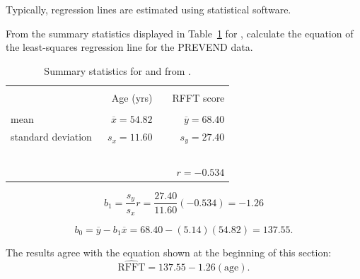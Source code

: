 Typically, regression lines are estimated using statistical software.

\begin{example}{From the summary statistics displayed in Table~\ref{summaryAgeRFFT} for , calculate the equation of the least-squares regression line for the PREVEND data.
		
\begin{table}[ht]
	\centering
	\begin{tabular}{l rr}
		\hline
		\vspace{-4mm} & & \\
		\vspace{0.4mm}	&	\ \ Age (yrs)	& \ \ RFFT score \\
		\hline
		\vspace{-3.9mm} & & \\
		mean	& $\overline{x} = 54.82$		& $\overline{y} = 68.40$ \\
		standard deviation		& $s_x = 11.60$		& $s_y = 27.40$\vspace{0.4mm} \\
		\hline
		\vspace{-4mm}\ &\\
		& \multicolumn{2}{r}{$r=-0.534$} \\
		\hline
	\end{tabular}
	\caption{Summary statistics for  and  from .}
	\label{summaryAgeRFFT}
\end{table}
}
	
\[b_1 = \frac{s_y}{s_x} r = \frac{27.40}{11.60}(-0.534) = -1.26\]

\[b_0 = \overline{y} - b_1\overline{x} = 68.40 - (5.14)(54.82) = 137.55. \]

The results agree with the equation shown at the beginning of this section:
\[\widehat{\text{RFFT}} = 137.55 - 1.26(\text{age}).\]
	
\end{example}


